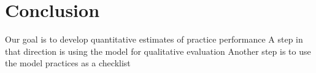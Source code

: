 \section{Conclusion}
\label{sec:conclusion}

	Our goal is to develop quantitative estimates of practice performance
	A step in that direction is using the model for qualitative evaluation
	Another step is to use the model practices as a checklist
